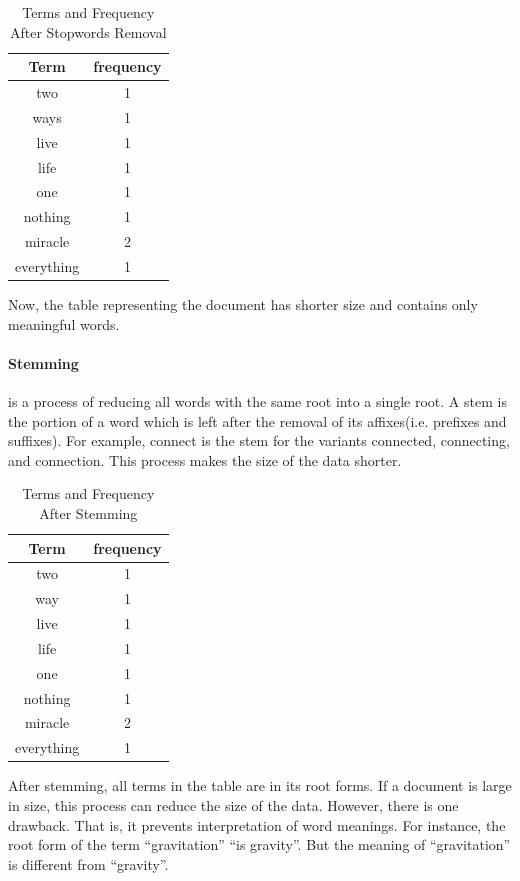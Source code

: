 \begin{table}
\centering
\begin{tabular}{|c|c|}
\hline \textbf{Term} & \textbf{frequency} \\
\hline two & 1 \\
\hline ways & 1 \\
\hline live & 1 \\
\hline life & 1 \\
\hline one & 1 \\
\hline nothing & 1 \\
\hline miracle & 2 \\
\hline everything & 1 \\  
\hline
\end{tabular}
\caption{Terms and Frequency After Stopwords Removal} \label{table:stopwordsremoval}
\end{table}
Now, the table representing the document has shorter size and contains only meaningful words.

\paragraph{Stemming} is a process of reducing all words with the same root into a single root. A stem is the portion of a word which is left after
the removal of its affixes(i.e. prefixes and suffixes). For example, connect is the stem for the variants connected, connecting, and connection.
This process makes the size of the data shorter. 

\begin{table}
\centering
\begin{tabular}{|c|c|}
\hline \textbf{Term} & \textbf{frequency} \\
\hline two & 1 \\
\hline way & 1 \\
\hline live & 1 \\
\hline life & 1 \\
\hline one & 1 \\
\hline nothing & 1 \\
\hline miracle & 2 \\
\hline everything & 1 \\  
\hline
\end{tabular}
\caption{Terms and Frequency After Stemming} \label{table:stemming}
\end{table}
After stemming, all terms in the table are in its root forms. If a document is large in size, this process can reduce the size of the data. However, 
there is one drawback. That is, it prevents interpretation of word meanings. For instance, the root form of the term ``gravitation'' ``is gravity''. But
the meaning of ``gravitation'' is different from ``gravity''.

